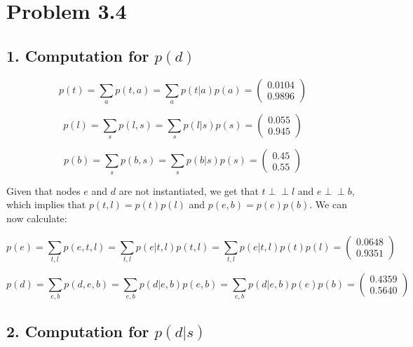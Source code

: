 \documentclass[11pt,a4paper,oneside]{report}
\newcommand\ci{\perp\!\!\!\perp} %
\begin{document}
\section*{Problem 3.4}


\subsection*{1. Computation for $p(d)$}

$$p(t) = \sum_{a}p(t,a) = \sum_{a}p(t|a)p(a) = 
\begin{pmatrix}
   0.0104\\
   0.9896
\end{pmatrix}
$$

$$p(l) = \sum_{s}p(l,s) = \sum_{s}p(l|s)p(s) = 
\begin{pmatrix}
   0.055\\
   0.945
\end{pmatrix}
$$

$$p(b) = \sum_{s}p(b,s) = \sum_{s}p(b|s)p(s) = 
\begin{pmatrix}
   0.45\\
   0.55
\end{pmatrix}
$$

Given that nodes $e$ and $d$ are not instantiated, we get that $t \ci l$ and $e 
\ci b$, which implies that $p(t,l) = p(t)p(l)$ and $p(e,b)=p(e)p(b)$. We can 
now calculate:

$$p(e) = \sum_{t,l}p(e,t,l) = \sum_{t,l}p(e|t,l)p(t,l) = 
\sum_{t,l}p(e|t,l)p(t)p(l) = 
\begin{pmatrix}
   0.0648\\
   0.9351
\end{pmatrix}
$$

$$p(d) = \sum_{e,b}p(d,e,b) = \sum_{e,b}p(d|e,b)p(e,b) = 
\sum_{e,b}p(d|e,b)p(e)p(b) = 
\begin{pmatrix}
   0.4359\\
   0.5640
\end{pmatrix}
$$
 
% 
% 

\subsection*{2. Computation for $p(d|s)$}
\end{document}
